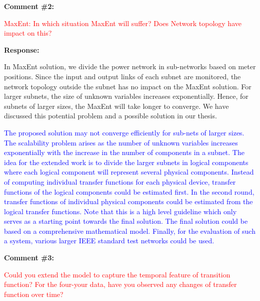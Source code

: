 \documentclass[journal]{IEEEtran}
\begin{document}
\vspace{30pt}
\textbf{Comment \#2:}
\begin{adjustwidth}{2.5em}{0pt}
\singlespacing \vspace{-10pt}
\textcolor{red}{MaxEnt: In which situation MaxEnt will suffer? Does Network topology have impact on this?}
\end{adjustwidth}

\vspace{10pt}
\textbf{Response:}
\begin{adjustwidth}{2.5em}{0pt}
In MaxEnt solution, we divide the power network in sub-networks based on meter positions. Since the input and output links of each subnet are monitored, the network topology outside the subnet has no impact on the MaxEnt solution. For larger subnets, the size of unknown variables increases exponentially. Hence, for subnets of larger sizes, the MaxEnt will take longer to converge. We have discussed this potential problem and a possible solution in our thesis.

\vspace{10pt}
\noindent\textcolor{blue}{The proposed solution may not converge efficiently for sub-nets of larger sizes. The scalability problem arises as the number of unknown variables increases exponentially with the increase in the number of components in a subnet. The idea for the extended work is to divide the larger subnets in logical components where each logical component will represent several physical components. Instead of computing individual transfer functions for each physical device, transfer functions of the logical components could be estimated first. In the second round, transfer functions of individual physical components could be estimated from the logical transfer functions. Note that this is a high level guideline which only serves as a starting point towards the final solution. The final solution could be based on a comprehensive mathematical model. Finally, for the evaluation of such a system, various larger IEEE standard test networks could be used.}
\end{adjustwidth}


\vspace{30pt}
\textbf{Comment \#3:}
\begin{adjustwidth}{2.5em}{0pt}
\singlespacing \vspace{-10pt}
\textcolor{red}{Could you extend the model to capture the temporal feature of transition function? For the four-your data, have you observed any changes of transfer function over time?}
\end{adjustwidth}
\end{document}
